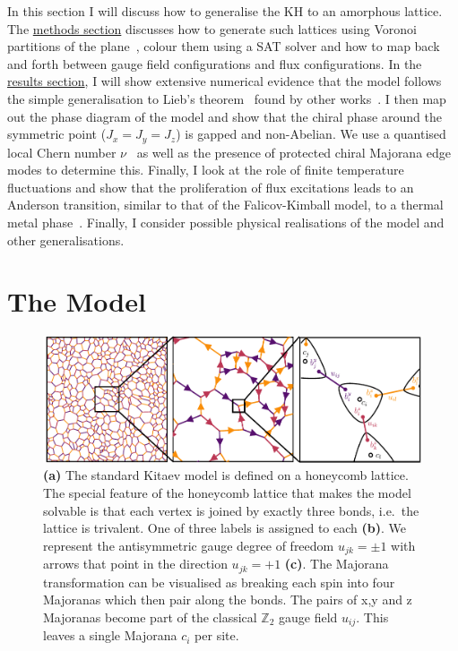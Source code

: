 In this section I will discuss how to generalise the KH to an amorphous lattice. The \protect\hyperlink{amk-methods}{methods section} discusses how to generate such lattices using Voronoi partitions of the plane~\autocite{mitchellAmorphousTopologicalInsulators2018,marsalTopologicalWeaireThorpeModels2020}, colour them using a SAT solver and how to map back and forth between gauge field configurations and flux configurations. In the \protect\hyperlink{amk-results}{results section}, I will show extensive numerical evidence that the model follows the simple generalisation to Lieb's theorem~\autocite{lieb_flux_1994} found by other works~\autocite{eschmannThermodynamicClassificationThreedimensional2020,Yao2009,eschmann2019thermodynamics,Peri2020}. I then map out the phase diagram of the model and show that the chiral phase around the symmetric point (\(J_x = J_y = J_z\)) is gapped and non-Abelian. We use a quantised local Chern number \(\nu\)~\autocite{peru_preprint,mitchellAmorphousTopologicalInsulators2018} as well as the presence of protected chiral Majorana edge modes to determine this. Finally, I look at the role of finite temperature fluctuations and show that the proliferation of flux excitations leads to an Anderson transition, similar to that of the Falicov-Kimball model, to a thermal metal phase~\autocite{Laumann2012,lahtinenTopologicalLiquidNucleation2012,selfThermallyInducedMetallic2019}. Finally, I consider possible physical realisations of the model and other generalisations.

\hypertarget{amk-Model}{%
\section{The Model}\label{amk-Model}}

\hypertarget{fig:amk-zoom}{%
\begin{figure}
\centering
\includegraphics[width=1\textwidth,height=\textheight]{figure_code/amk_chapter/intro/amk_zoom/amk_zoom_by_hand}
\caption[{The Kitaev Honeycomb Model}]{\textbf{(a)} The standard Kitaev model is defined on a honeycomb lattice. The special feature of the honeycomb lattice that makes the model solvable is that each vertex is joined by exactly three bonds, i.e.~the lattice is trivalent. One of three labels is assigned to each \textbf{(b)}. We represent the antisymmetric gauge degree of freedom \(u_{jk} = \pm 1\) with arrows that point in the direction \(u_{jk} = +1\) \textbf{(c)}. The Majorana transformation can be visualised as breaking each spin into four Majoranas which then pair along the bonds. The pairs of x,y and z Majoranas become part of the classical \(\mathbb{Z}_2\) gauge field \(u_{ij}\). This leaves a single Majorana \(c_i\) per site.}
\label{fig:amk-zoom}
\end{figure}
}

